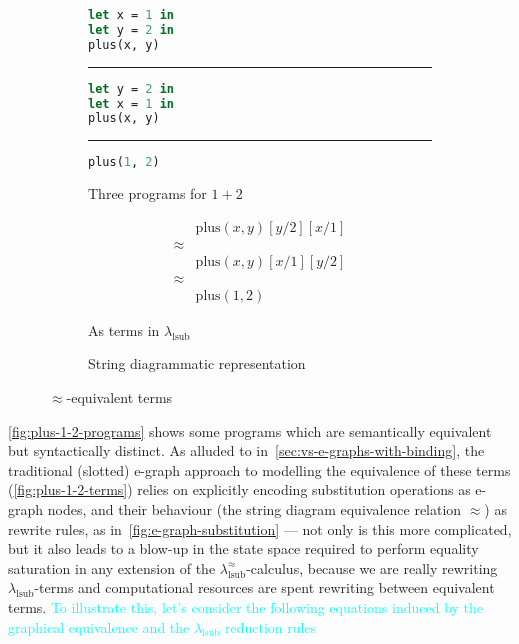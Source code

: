 \begin{figure}
	\centering
	\begin{subfigure}{0.3\linewidth}
		\begin{lstlisting}[language=ML]
let x = 1 in
let y = 2 in
plus(x, y)
                \end{lstlisting}
		\hrule
		\begin{lstlisting}[language=ML]
let y = 2 in
let x = 1 in
plus(x, y)
                \end{lstlisting}
		\hrule
		\begin{lstlisting}[language=ML]
plus(1, 2)
                \end{lstlisting}
		\caption{Three programs for $1 + 2$}%
		\label{fig:plus-1-2-programs}
	\end{subfigure}
	\hspace{2em}
	\begin{subfigure}{0.2\linewidth}
		\begin{align*}
			        & \text{plus}(x, y)[y/2][x/1] \\
			\approx &                             \\
			        & \text{plus}(x, y)[x/1][y/2] \\
			\approx &                             \\
			        & \text{plus}(1, 2)
		\end{align*}
		\caption{As terms in $\lambda_{\text{lsub}}$}%
		\label{fig:plus-1-2-terms}
	\end{subfigure}
	\hspace{2em}
	\begin{subfigure}{0.2\linewidth}
		\centering
		\caption{String diagrammatic representation}%
		\label{fig:plus-1-2-string-diagram}
	\end{subfigure}
	\caption{$\approx$-equivalent terms}%
	\label{fig:plus-1-2}
\end{figure}

\autoref{fig:plus-1-2-programs} shows some programs which are semantically equivalent but syntactically distinct.
As alluded to in~\autoref{sec:vs-e-graphs-with-binding}, the traditional (slotted) e-graph approach to modelling the equivalence of these terms (\autoref{fig:plus-1-2-terms}) relies on explicitly encoding substitution operations as e-graph nodes, and their behaviour (the string diagram equivalence relation $\approx$) as rewrite rules, as in~\autoref{fig:e-graph-substitution} --- not only is this more complicated, but it also leads to a blow-up in the state space required to perform equality saturation in any extension of the $\lambda^\approx_{\text{lsub}}$-calculus, because we are really rewriting $\lambda_{\text{lsub}}$-terms and computational resources are spent rewriting between equivalent terms.
\textcolor{cyan}{To illustrate this, let's consider the following equations induced by the graphical equivalence and the $\lambda_{\text{lsub}}$ reduction rules}

